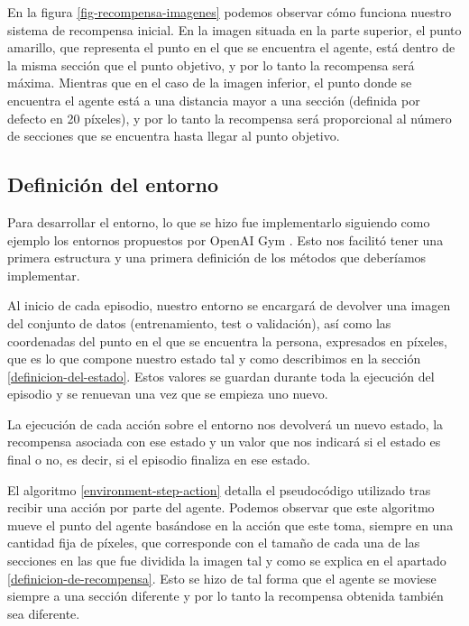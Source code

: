 En la figura \ref{fig-recompensa-imagenes} podemos observar cómo funciona nuestro sistema de recompensa inicial. En la imagen situada en la parte superior, el punto amarillo, que representa el punto en el que se encuentra el agente, está dentro de la misma sección que el punto objetivo, y por lo tanto la recompensa será máxima. Mientras que en el caso de la imagen inferior, el punto donde se encuentra el agente está a una distancia mayor a una sección (definida por defecto en 20 píxeles), y por lo tanto la recompensa será proporcional al número de secciones que se encuentra hasta llegar al punto objetivo.

\subsection{Definición del entorno}
\label{definicion-del-entorno}

Para desarrollar el entorno, lo que se hizo fue implementarlo siguiendo como ejemplo los entornos propuestos por OpenAI Gym \citep{openaigym}. Esto nos facilitó tener una primera estructura y una primera definición de los métodos que deberíamos implementar.
\medskip

Al inicio de cada episodio, nuestro entorno se encargará de devolver una imagen del conjunto de datos (entrenamiento, test o validación), así como las coordenadas del punto en el que se encuentra la persona, expresados en píxeles, que es lo que compone nuestro estado tal y como describimos en la sección \ref{definicion-del-estado}. Estos valores se guardan durante toda la ejecución del episodio y se renuevan una vez que se empieza uno nuevo.
\medskip


La ejecución de cada acción sobre el entorno nos devolverá un nuevo estado, la recompensa asociada con ese estado y un valor que nos indicará si el estado es final o no, es decir, si el episodio finaliza en ese estado. 
\medskip

El algoritmo \ref{environment-step-action} detalla el pseudocódigo utilizado tras recibir una acción por parte del agente. Podemos observar que este algoritmo mueve el punto del agente basándose en la acción que este toma, siempre en una cantidad fija de píxeles, que corresponde con el tamaño de cada una de las secciones en las que fue dividida la imagen tal y como se explica en el apartado \ref{definicion-de-recompensa}. Esto se hizo de tal forma que el agente se moviese siempre a una sección diferente y por lo tanto la recompensa obtenida también sea diferente.
\medskip

